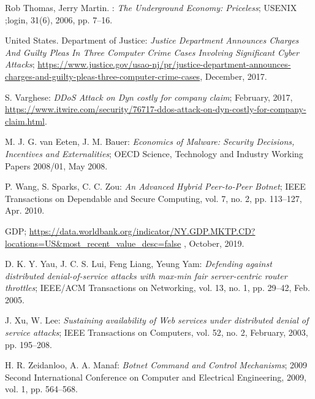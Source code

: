 \begin{thebibliography}{99}
 Rob Thomas, Jerry Martin. : \emph{The Underground Economy: Priceless}; USENIX ;login, 31(6), 2006, pp. 7--16.

 United States. Department of Justice: \emph{Justice Department Announces Charges And Guilty Pleas In Three Computer Crime Cases Involving Significant Cyber Attacks}; \url{https://www.justice.gov/usao-nj/pr/justice-department-announces-charges-and-guilty-pleas-three-computer-crime-cases}, December, 2017.

 S. Varghese: \emph{DDoS Attack on Dyn costly for company claim}; February, 2017, \url{https://www.itwire.com/security/76717-ddos-attack-on-dyn-costly-for-company-claim.html}.

 M. J. G. van Eeten, J. M. Bauer: \emph{Economics of Malware: Security Decisions, Incentives and Externalities}; OECD Science, Technology and Industry Working Papers 2008/01, May 2008.

 P. Wang, S. Sparks, C. C. Zou: \emph{An Advanced Hybrid Peer-to-Peer Botnet}; IEEE Transactions on Dependable and Secure Computing, vol. 7, no. 2, pp. 113--127, Apr. 2010.

 GDP; \url{https://data.worldbank.org/indicator/NY.GDP.MKTP.CD?locations=US&most_recent_value_desc=false} , October, 2019.

 D. K. Y. Yau, J. C. S. Lui, Feng Liang, Yeung Yam: \emph{Defending against distributed denial-of-service attacks with max-min fair server-centric router throttles}; IEEE/ACM Transactions on Networking, vol. 13, no. 1, pp. 29--42, Feb. 2005.

 J. Xu, W. Lee: \emph{Sustaining availability of Web services under distributed denial of service attacks}; IEEE Transactions on Computers, vol. 52, no. 2, February, 2003, pp. 195--208.

 H. R. Zeidanloo, A. A. Manaf: \emph{Botnet Command and Control Mechanisms}; 2009 Second International Conference on Computer and Electrical Engineering, 2009, vol. 1, pp. 564--568.

\end{thebibliography}



